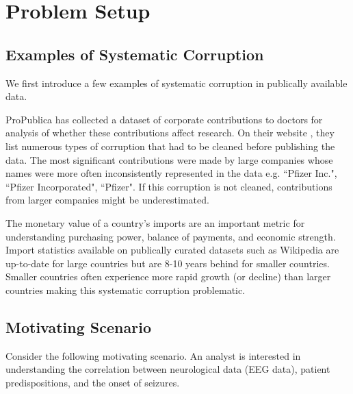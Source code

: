 \section{Problem Setup}\label{background}

\subsection{Examples of Systematic Corruption}
We first introduce a few examples of systematic corruption in publically available data.

\begin{example}
ProPublica has collected a dataset of corporate contributions to doctors for analysis of whether these contributions affect research.
On their website \cite{dollarsfordocs}, they list numerous types of corruption that had to be cleaned before publishing the data.
The most significant contributions were made by large companies whose names were more often inconsistently represented in the data e.g. ``Pfizer Inc.", ``Pfizer Incorporated", ``Pfizer".
If this corruption is not cleaned, contributions from larger companies might be underestimated.
\end{example}

\begin{example}
The monetary value of a country's imports are an important metric for understanding purchasing power, balance of payments, and economic strength. 
Import statistics available on publically curated datasets such as Wikipedia \cite{importstats} are up-to-date for large countries but are 8-10 years behind for smaller countries. 
Smaller countries often experience more rapid growth (or decline) than larger countries making this systematic corruption problematic.
\end{example}

\subsection{Motivating Scenario}
Consider the following motivating scenario.
An analyst is interested in understanding the correlation between neurological data (EEG data), patient predispositions, and the onset of seizures.

